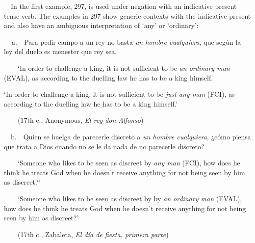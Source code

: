 \begin{styleStandard}
\ \ In the first example, 297, is used under negation with an indicative present tense verb. The examples in 297 show generic contexts with the indicative present and also have an ambiguous interpretation of ‘any’ or ‘ordinary’:
\end{styleStandard}

\begin{styleStandard}
\textbf{\ \ }a.\ \ Para pedir campo a un rey no basta \textit{un hombre cualquiera}, que según la ley del duelo es menester que rey sea. 
\end{styleStandard}

\begin{styleStandard}
\ \ \ \ ‘In order to challenge a king, it is not sufficient to be \textit{an ordinary man} (EVAL), as according to the duelling law he has to be a king himself.’
\end{styleStandard}

\begin{styleStandard}
‘In order to challenge a king, it is not sufficient to be\textit{ just any man} (FCI), as according to the duelling law he has to be a king himself.’
\end{styleStandard}

\begin{styleStandard}
\ \ \ \ (17th c., Anonymous, \textit{El rey don Alfonso})
\end{styleStandard}

\begin{styleStandard}
\ \ b.\ \ Quien se huelga de parecerle discreto a \textit{un hombre cualquiera}, ¿cómo piensa que trata a Dios cuando no se le da nada de no parecerle discreto? 
\end{styleStandard}

\begin{styleStandard}
\ \ \ \ ‘Someone who likes to be seen as discreet by \textit{any man} (FCI), how does he think he treats God when he doesn’t receive anything for not being seen by him as discreet?’
\end{styleStandard}

\begin{styleStandard}
\ \ \ \ ‘Someone who likes to be seen as discreet by by \textit{an ordinary man} (EVAL), how does he think he treats God when he doesn’t receive anything for not being seen by him as discreet?’
\end{styleStandard}

\begin{styleStandard}
\ \ \ \ (17th c., Zabaleta, \textit{El día de fiesta, primera parte})
\end{styleStandard}

